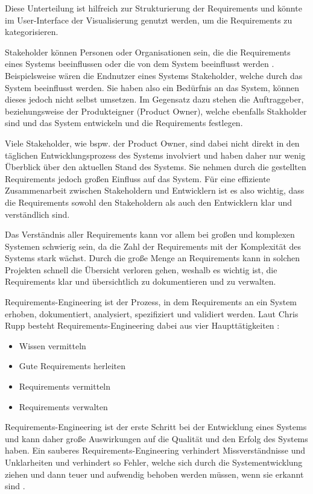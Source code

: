    Diese Unterteilung ist hilfreich zur Strukturierung der Requirements und könnte im User-Interface der Visualisierung genutzt werden, um die Requirements zu kategorisieren.
    

    Stakeholder können \glqq{}Personen oder Organisationen sein, die die Requirements eines Systems beeinflussen oder die von dem System beeinflusst werden\grqq{} \autocite[][]{ireb_cpre_glossary}.
    Beispielsweise wären die Endnutzer eines Systems Stakeholder, welche durch das System beeinflusst werden.
    Sie haben also ein Bedürfnis an das System, können dieses jedoch nicht selbst umsetzen.
    Im Gegensatz dazu stehen die Auftraggeber, beziehungsweise der Produkteigner (Product Owner), welche ebenfalls Stakholder sind und das System entwickeln und die Requirements festlegen.

    Viele Stakeholder, wie bspw. der Product Owner, sind dabei nicht direkt in den täglichen Entwicklungsprozess des Systems involviert und haben daher nur wenig Überblick über den aktuellen Stand des Systems.
    Sie nehmen durch die gestellten Requirements jedoch großen Einfluss auf das System.
    Für eine effiziente Zusammenarbeit zwischen Stakeholdern und Entwicklern ist es also wichtig, dass die Requirements sowohl den Stakeholdern als auch den Entwicklern klar und verständlich sind.

    Das Verständnis aller Requirements kann vor allem bei großen und komplexen Systemen schwierig sein, da die Zahl der Requirements mit der Komplexität des Systems stark wächst.
    Durch die große Menge an Requirements kann in solchen Projekten schnell die Übersicht verloren gehen, weshalb es wichtig ist, die Requirements klar und übersichtlich zu dokumentieren und zu verwalten.


    Requirements-Engineering ist der Prozess, in dem Requirements an ein System erhoben, dokumentiert, analysiert, spezifiziert und validiert werden.
    Laut Chris Rupp besteht Requirements-Engineering dabei aus vier Haupttätigkeiten \autocite[][S.20]{Rupp2014}:
    \begin{itemize}
        \item Wissen vermitteln
        \item Gute Requirements herleiten
        \item Requirements vermitteln
        \item Requirements verwalten
    \end{itemize}
    Requirements-Engineering ist der erste Schritt bei der Entwicklung eines Systems und kann daher große Auswirkungen auf die Qualität und den Erfolg des Systems haben.
    Ein sauberes Requirements-Engineering verhindert Missverständnisse und Unklarheiten und verhindert so Fehler, welche sich durch die Systementwicklung ziehen und dann teuer und aufwendig behoben werden müssen, wenn sie erkannt sind \autocite[][S.20]{Rupp2014}.

